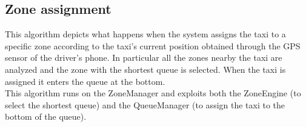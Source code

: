 \documentclass[a4paper,11pt]{report} %
\begin{document}
	\pagebreak
	
	\subsection{Zone assignment} \label{sec:AlgoZone}
	This algorithm depicts what happens when the system assigns the taxi to a specific zone according to the taxi's current position obtained through the GPS sensor of the driver's phone. In particular all the zones nearby the taxi are analyzed and the zone with the shortest queue is selected. When the taxi is assigned it enters the queue at the bottom.\\
	This algorithm runs on the ZoneManager and exploits both the ZoneEngine (to select the shortest queue) and the QueueManager (to assign the taxi to the bottom of the queue).\\
	
\end{document}
